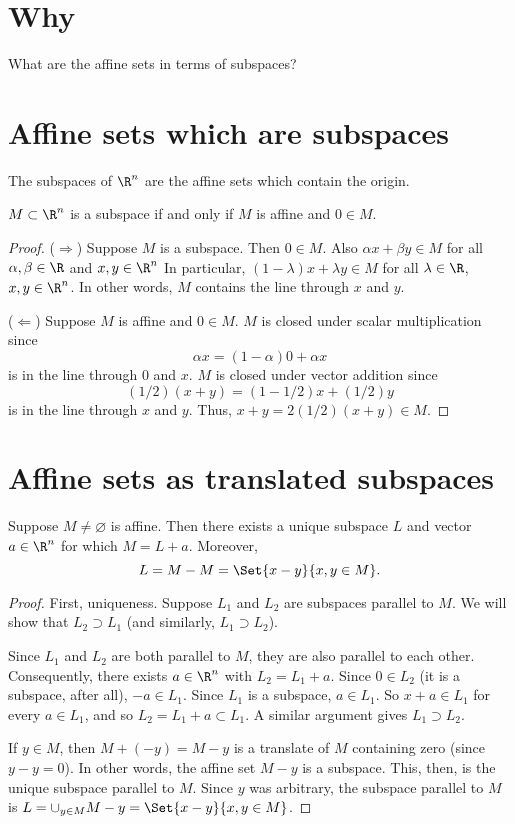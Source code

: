 
\section*{Why}

What are the affine sets in terms of subspaces?

\section*{Affine sets which are subspaces}

The subspaces of $\R ^n$ are the affine sets which contain the origin.

\begin{proposition}
$M \subset \R ^n$ is a subspace if and only if $M$ is affine and $0 \in M$.
\begin{proof}
($\Rightarrow$)
Suppose $M$ is a subspace.
Then $0 \in M$.
Also $\alpha x + \beta y \in M$ for all $\alpha , \beta  \in \R $ and $x, y \in \R ^n$
In particular, $(1- \lambda )x + \lambda y \in M$ for all $\lambda  \in \R $, $x, y \in \R ^n$.
In other words, $M$ contains the line through $x$ and $y$.

($\Leftarrow$) Suppose $M$ is affine and $0 \in M$.
$M$ is closed under scalar multiplication since
\[
\alpha x = (1 - \alpha )0 + \alpha x
\]
is in the line through $0$ and $x$.
$M$ is closed under vector addition since
\[
(1/2)(x + y) = (1-1/2)x + (1/2)y
\]
is in the line through $x$ and $y$.
Thus, $x+y = 2(1/2)(x+y) \in M$.\end{proof}
\end{proposition}

\section*{Affine sets as translated subspaces}

\begin{proposition}
Suppose $M \neq \varnothing$ is affine.
Then there exists a unique subspace $L$ and vector $a \in \R ^n$ for which $M = L + a$.
Moreover,
\[
L = M - M = \Set{x - y}{x,y \in M}.
\]
\end{proposition}

\begin{proof}First, uniqueness.
Suppose $L_1$ and $L_2$ are subspaces parallel to $M$.
We will show that $L_2 \supset L_1$ (and similarly, $L_1 \supset L_2$).

Since $L_1$ and $L_2$ are both parallel to $M$, they are also parallel to each other.
Consequently, there exists $a \in \R ^n$ with $L_2 = L_1 + a$.
Since $0 \in L_2$ (it is a subspace, after all), $-a \in L_1$.
Since $L_1$ is a subspace, $a \in L_1$.
So $x + a \in L_1$ for every $a \in L_1$, and so $L_2 = L_1 + a \subset L_1$.
A similar argument gives $L_1 \supset L_2$.

If $y \in M$, then $M + (-y) = M - y$ is a translate of $M$ containing zero (since $y - y = 0$).
In other words, the affine set $M - y$ is a subspace.
This, then, is the unique subspace parallel to $M$.
Since $y$ was arbitrary, the subspace parallel to $M$ is $L = \cup_{y \in M} M - y = \Set{x - y}{x,y \in M}$.\end{proof}